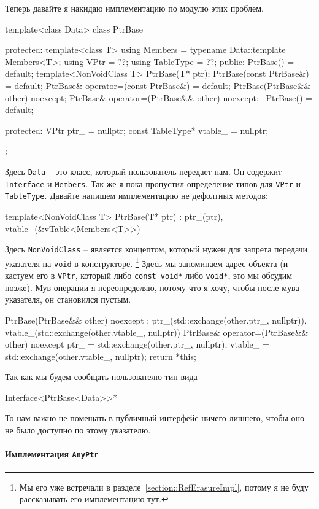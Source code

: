 Теперь давайте я накидаю имплементацию по модулю этих проблем.
\begin{cppcode}
template<class Data>
class PtrBase {
protected:
  template<class T>
  using Members = typename Data::template Members<T>;
  using VPtr = ??;
  using TableType = ??;
public:
  PtrBase() = default;
  template<NonVoidClass T>
  PtrBase(T* ptr);
  PtrBase(const PtrBase&) = default;
  PtrBase& operator=(const PtrBase&) = default;
  PtrBase(PtrBase&& other) noexcept;
  PtrBase& operator=(PtrBase&& other) noexcept;
  ~PtrBase() = default;
  
protected:
  VPtr ptr_ = nullptr;
  const TableType* vtable_ = nullptr;
};
\end{cppcode}
Здесь \verb"Data" -- это класс, который пользователь передает нам.
Он содержит \verb"Interface" и \verb"Members".
Так же я пока пропустил определение типов для \verb"VPtr" и \verb"TableType".
Давайте напишем имплементацию не дефолтных методов:
\begin{cppcode}
template<NonVoidClass T>
PtrBase(T* ptr) : ptr_(ptr), vtable_(&vTable<Members<T>>) {
}
\end{cppcode}
Здесь \verb"NonVoidClass" -- является концептом, который нужен для запрета передачи указателя на \verb"void" в конструкторе.%
\footnote{Мы его уже встречали в разделе~\ref{section::RefErasureImpl}, потому я не буду рассказывать его имплементацию тут.}
Здесь мы запоминаем адрес объекта (и кастуем его в \verb"VPtr", который либо \verb"const void*" либо \verb"void*", это мы обсудим позже).
Мув операции я переопределяю, потому что я хочу, чтобы после мува указателя, он становился пустым.
\begin{cppcode}
  PtrBase(PtrBase&& other) noexcept
      : ptr_(std::exchange(other.ptr_, nullptr)),
        vtable_(std::exchange(other.vtable_, nullptr)) {
  }
  PtrBase& operator=(PtrBase&& other) noexcept {
    ptr_ = std::exchange(other.ptr_, nullptr);
    vtable_ = std::exchange(other.vtable_, nullptr);
    return *this;
  }
\end{cppcode}
Так как мы будем сообщать пользователю тип вида
\begin{cppcode}[numbers = none]
Interface<PtrBase<Data>>*
\end{cppcode}
То нам важно не помещать в публичный интерфейс ничего лишнего, чтобы оно не было доступно по этому указателю.

\paragraph{Имплементация \texttt{AnyPtr}}

